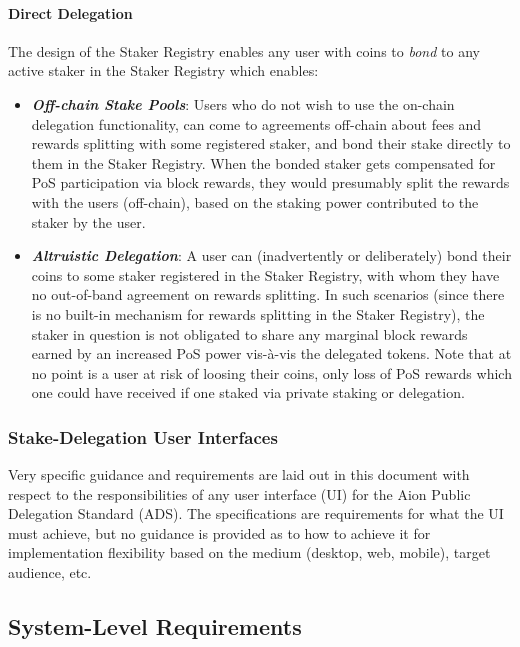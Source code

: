 \paragraph{Direct Delegation}
The design of the Staker Registry enables any user with coins to \textit{bond} to any active staker in the Staker Registry which enables:
\begin{itemize}
    \item \textbf{\textit{Off-chain Stake Pools}}: Users who do not wish to use the on-chain delegation functionality, can come to agreements off-chain about fees and rewards splitting with some registered staker, and bond their stake directly to them in the Staker Registry. When the bonded staker gets compensated for PoS participation via block rewards, they would presumably split the rewards with the users (off-chain), based on the staking power contributed to the staker by the user. 
    
    \item \textbf{\textit{Altruistic Delegation}}: A user can (inadvertently or deliberately) bond their coins to some staker registered in the Staker Registry, with whom they have no out-of-band agreement on rewards splitting. In such scenarios (since there is no built-in mechanism for rewards splitting in the Staker Registry), the staker in question is not obligated to share any marginal block rewards earned by an increased PoS power vis-à-vis the  delegated tokens. Note that at no point is a user at risk of loosing their coins, only loss of PoS rewards which one could have received if one staked via private staking or delegation. 
\end{itemize}

\subsubsection{Stake-Delegation User Interfaces}
Very specific guidance and requirements are laid out in this document with respect to the responsibilities of any user interface (UI) for the Aion Public Delegation Standard (ADS). The specifications are requirements for what the UI must achieve, but no guidance is provided as to how to achieve it for implementation flexibility based on the medium (desktop, web, mobile), target audience, etc. 

\subsection{System-Level Requirements}


